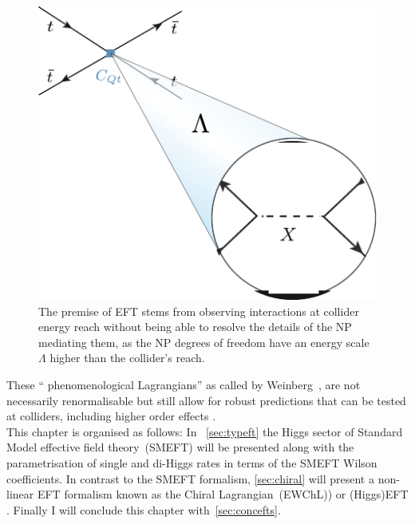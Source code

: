 \begin{figure}[h!]
	\begin{center}
		\includegraphics[width=.4 \linewidth]{figures/EFT}
		\caption{The premise of EFT stems from observing interactions at collider energy reach without being able to resolve the details of the NP mediating them, as the NP degrees of freedom have an energy scale $\Lambda$ higher than the collider's reach. }
		\label{fig:eft}
	\end{center}
\end{figure}
These `` phenomenological Lagrangians'' as called by Weinberg~\cite{WEINBERG1979327}, are not necessarily renormalisable but still allow for robust predictions that can be tested at colliders, including higher order effects . \\
This chapter  is organised as follows:  In ~\autoref{sec:typeft} the Higgs sector of Standard Model effective field theory~(SMEFT) will be presented along with the parametrisation of single and di-Higgs rates in terms of the SMEFT Wilson coefficients. In contrast to the SMEFT formalism, \autoref{sec:chiral} will present a non-linear EFT formalism known as the Chiral Lagrangian~(EWChL)) or (Higgs)EFT . Finally I will conclude this chapter with~\autoref{sec:concefts}.
